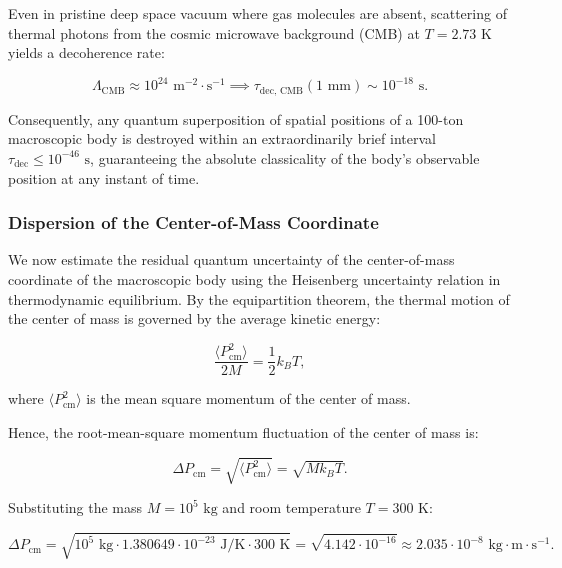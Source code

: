 Even in pristine deep space vacuum where gas molecules are absent, scattering of thermal photons from the cosmic microwave background (CMB) at $T = 2.73\text{ K}$ yields a decoherence rate:

\begin{equation}\label{eq:5.14}\tag{5.14}
\Lambda_{\text{CMB}} \approx 10^{24}\text{ m}^{-2}\cdot\text{s}^{-1} \implies \tau_{\text{dec, CMB}}(1\text{ mm}) \sim 10^{-18}\text{ s}.
\end{equation}

Consequently, any quantum superposition of spatial positions of a 100-ton macroscopic body is destroyed within an extraordinarily brief interval $\tau_{\text{dec}} \le 10^{-46}\text{ s}$, guaranteeing the absolute classicality of the body's observable position at any instant of time.

\subsubsection{Dispersion of the Center-of-Mass Coordinate}\label{sec:5.1.4}

We now estimate the residual quantum uncertainty of the center-of-mass coordinate of the macroscopic body using the Heisenberg uncertainty relation in thermodynamic equilibrium. By the equipartition theorem, the thermal motion of the center of mass is governed by the average kinetic energy:

\begin{equation}\label{eq:5.15}\tag{5.15}
\frac{\langle P_{\text{cm}}^2 \rangle}{2 M} = \frac{1}{2} k_B T,
\end{equation}

where $\langle P_{\text{cm}}^2 \rangle$ is the mean square momentum of the center of mass.

Hence, the root-mean-square momentum fluctuation of the center of mass is:

\begin{equation}\label{eq:5.16}\tag{5.16}
\Delta P_{\text{cm}} = \sqrt{\langle P_{\text{cm}}^2 \rangle} = \sqrt{M k_B T}.
\end{equation}

Substituting the mass $M = 10^5\text{ kg}$ and room temperature $T = 300\text{ K}$:

\begin{equation}\label{eq:5.17}\tag{5.17}
\Delta P_{\text{cm}} = \sqrt{10^5\text{ kg} \cdot 1.380649 \cdot 10^{-23}\text{ J/K} \cdot 300\text{ K}} = \sqrt{4.142 \cdot 10^{-16}} \approx 2.035 \cdot 10^{-8}\text{ kg}\cdot\text{m}\cdot\text{s}^{-1}.
\end{equation}

